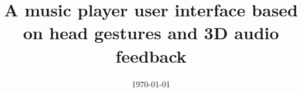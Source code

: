 \documentclass[a4paper, 11pt, oneside]{Thesis}  %
\begin{document}


\frontmatter      %

\title  {A music player user interface based on head gestures and 3D audio feedback}
\addresses  {\groupname\\\deptname\\\univname}  %
\date       {\today}
\subject    {}
\keywords   {}

\maketitle


\fancyhead{}  %
\rhead{\thepage}  %
\lhead{}  %

\pagestyle{fancy}  %




\end{document}

